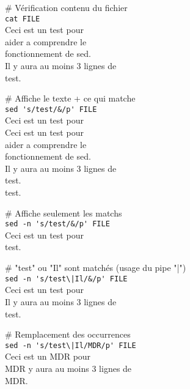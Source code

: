 \documentclass[10pt,landscape]{article}
\begin{document}
\begin{multicols}{3}
\smallskip

\# Vérification contenu du fichier\\
\verb!cat FILE!\\
\textrightarrow Ceci est un test pour\\
\textrightarrow aider a comprendre le\\
\textrightarrow fonctionnement de sed.\\
\textrightarrow Il y aura au moins 3 lignes de\\
\textrightarrow test.\\

\smallskip

\# Affiche le texte + ce qui matche\\
\verb!sed 's/test/&/p' FILE!\\
\textrightarrow Ceci est un test pour\\
\textrightarrow Ceci est un test pour\\
\textrightarrow aider a comprendre le\\
\textrightarrow fonctionnement de sed.\\
\textrightarrow Il y aura au moins 3 lignes de\\
\textrightarrow test.\\
\textrightarrow test.\\

\smallskip

\# Affiche seulement les matchs\\
\verb!sed -n 's/test/&/p' FILE!\\
\textrightarrow Ceci est un test pour\\
\textrightarrow test.\\

\smallskip

\# "test" ou "Il" sont matchés (usage du pipe "|")\\
\verb!sed -n 's/test\|Il/&/p' FILE!\\
\textrightarrow Ceci est un test pour\\
\textrightarrow Il y aura au moins 3 lignes de\\
\textrightarrow test.\\

\smallskip

\# Remplacement des occurrences\\
\verb!sed -n 's/test\|Il/MDR/p' FILE!\\
\textrightarrow Ceci est un MDR pour\\
\textrightarrow MDR y aura au moins 3 lignes de\\
\textrightarrow MDR.\\


\end{multicols}
\end{document}
